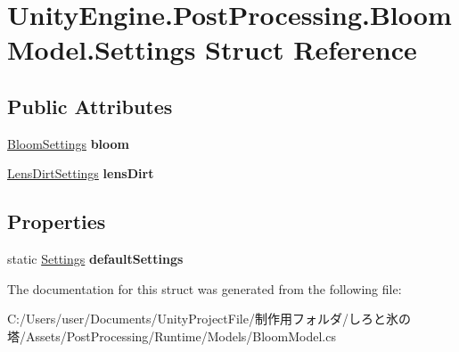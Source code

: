 \hypertarget{struct_unity_engine_1_1_post_processing_1_1_bloom_model_1_1_settings}{}\section{Unity\+Engine.\+Post\+Processing.\+Bloom\+Model.\+Settings Struct Reference}
\label{struct_unity_engine_1_1_post_processing_1_1_bloom_model_1_1_settings}
\subsection*{Public Attributes}
\begin{DoxyCompactItemize}
\item 
\mbox{\label{struct_unity_engine_1_1_post_processing_1_1_bloom_model_1_1_settings_a67ea8696d631446369685adfd283cc6a}} 
\hyperlink{struct_unity_engine_1_1_post_processing_1_1_bloom_model_1_1_bloom_settings}{Bloom\+Settings} {\bfseries bloom}
\item 
\mbox{\label{struct_unity_engine_1_1_post_processing_1_1_bloom_model_1_1_settings_a5da17f7be340ea4ea3b7bcde312d5953}} 
\hyperlink{struct_unity_engine_1_1_post_processing_1_1_bloom_model_1_1_lens_dirt_settings}{Lens\+Dirt\+Settings} {\bfseries lens\+Dirt}
\end{DoxyCompactItemize}
\subsection*{Properties}
\begin{DoxyCompactItemize}
\item 
\mbox{\label{struct_unity_engine_1_1_post_processing_1_1_bloom_model_1_1_settings_a97ac6c2e2540e9df3929e0fc0d754aa7}} 
static \hyperlink{struct_unity_engine_1_1_post_processing_1_1_bloom_model_1_1_settings}{Settings} {\bfseries default\+Settings}
\end{DoxyCompactItemize}


The documentation for this struct was generated from the following file\+:\begin{DoxyCompactItemize}
\item 
C\+:/\+Users/user/\+Documents/\+Unity\+Project\+File/制作用フォルダ/しろと氷の塔/\+Assets/\+Post\+Processing/\+Runtime/\+Models/Bloom\+Model.\+cs\end{DoxyCompactItemize}

